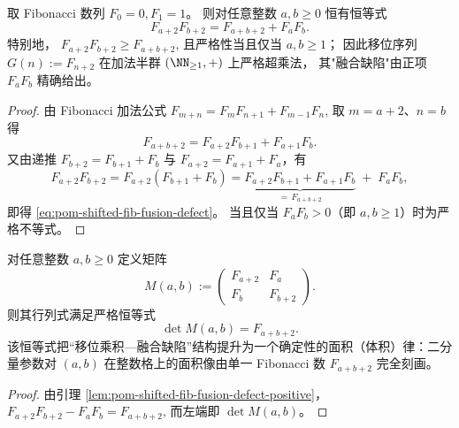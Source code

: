 \begin{lemma}\label{lem:pom-shifted-fib-fusion-defect-positive}
取 Fibonacci 数列 \(F_0=0,F_1=1\)。
则对任意整数 \(a,b\ge 0\) 恒有恒等式
\begin{equation}\label{eq:pom-shifted-fib-fusion-defect}
\boxed{\;
F_{a+2}F_{b+2}=F_{a+b+2}+F_aF_b.\;}
\end{equation}
特别地，
\(
F_{a+2}F_{b+2}\ge F_{a+b+2}
\),
且严格性当且仅当 \(a,b\ge 1\)；
因此移位序列 \(G(n):=F_{n+2}\) 在加法半群 \((\NN_{\ge 1},+)\) 上严格超乘法，
其"融合缺陷"由正项 \(F_aF_b\) 精确给出。
\end{lemma}
\begin{proof}
由 Fibonacci 加法公式
\(
F_{m+n}=F_mF_{n+1}+F_{m-1}F_n
\),
取 \(m=a+2\)、\(n=b\) 得
\[
F_{a+b+2}=F_{a+2}F_{b+1}+F_{a+1}F_b.
\]
又由递推 \(F_{b+2}=F_{b+1}+F_b\) 与 \(F_{a+2}=F_{a+1}+F_a\)，有
\[
F_{a+2}F_{b+2}
=F_{a+2}(F_{b+1}+F_b)
=\underbrace{F_{a+2}F_{b+1}+F_{a+1}F_b}_{=\,F_{a+b+2}}
\;+\;F_aF_b,
\]
即得 \eqref{eq:pom-shifted-fib-fusion-defect}。
当且仅当 \(F_aF_b>0\)（即 \(a,b\ge 1\)）时为严格不等式。
\end{proof}

\begin{corollary}\label{cor:pom-fib-determinant-volume-law}
对任意整数 \(a,b\ge 0\) 定义矩阵
\[
M(a,b):=\begin{pmatrix}
F_{a+2} & F_a\\
F_b & F_{b+2}
\end{pmatrix}.
\]
则其行列式满足严格恒等式
\[
\boxed{\;\det M(a,b)=F_{a+b+2}.\;}
\]
该恒等式把“移位乘积—融合缺陷”结构提升为一个确定性的面积（体积）律：二分量参数对 \((a,b)\) 在整数格上的面积像由单一 Fibonacci 数 \(F_{a+b+2}\) 完全刻画。
\end{corollary}
\begin{proof}
由引理 \ref{lem:pom-shifted-fib-fusion-defect-positive}，
\(
F_{a+2}F_{b+2}-F_aF_b=F_{a+b+2}
\),
而左端即 \(\det M(a,b)\)。
\end{proof}

